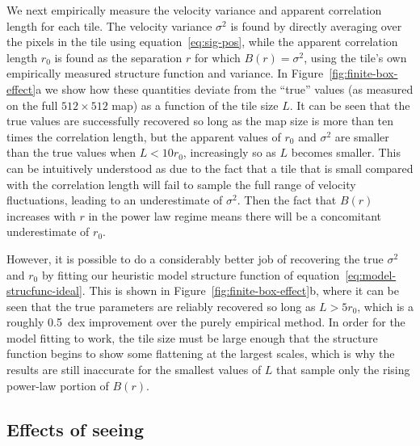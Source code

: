 \documentclass[fleqn,usenatbib, useAMS, a4paper]{mnras}
\newcommand\startNEW{\color{NEWcolor}}
\newcommand\stopNEW{\color{black}}
\newcommand\NEW[1]{\startNEW #1\stopNEW\relax}
\begin{document}
We next empirically measure the velocity variance and
apparent correlation length for each tile.
The velocity variance \(\sigma^2\) is found by
directly averaging over the pixels in the tile using equation~\eqref{eq:sig-pos},
while the apparent correlation length \(r_0\)
is found as the separation \(r\) for which \(B(r) = \sigma^2\),
using the tile's own empirically measured structure function and variance.
In \NEW{Figure~\ref{fig:finite-box-effect}a} we show how these
quantities deviate from the ``true'' values
(as measured on the full \(512 \times 512\) map)
as a function of the tile size \(L\).
It can be seen that the true values are successfully recovered
so long as the map size is more than ten times the correlation length,
but the apparent values of \(r_0\) and \(\sigma^2\) are smaller than the true values
when \(L < 10 r_0\), increasingly so as \(L\) becomes smaller.
This can be intuitively understood as due to the fact that a tile that
is small compared with the correlation length will
fail to sample the full range of velocity fluctuations,
leading to an underestimate of \(\sigma^2\).
Then the fact that \(B(r)\) increases with \(r\) in the power law regime
means there will be a concomitant underestimate of \(r_0\).

However, it is possible to do a considerably better job
of recovering the true \(\sigma^2\) and \(r_0\) by fitting our
heuristic model structure function of equation~\eqref{eq:model-strucfunc-ideal}.
This is shown in \NEW{Figure~\ref{fig:finite-box-effect}b}, where it can be seen
that the true parameters are reliably recovered so long as \NEW{\(L > 5 r_0\)},
which is a roughly \SI{0.5}{dex} improvement over the purely empirical method.
In order for the model fitting to work, the tile size must be large enough
that the structure function begins to show some flattening at the largest scales,
which is why the results are still inaccurate for the smallest values of \(L\)
that sample only the rising power-law portion of \(B(r)\). 

\startNEW
\subsection{Effects of seeing}
\label{sec:effects-seeing-struc}
\stopNEW
\end{document}
